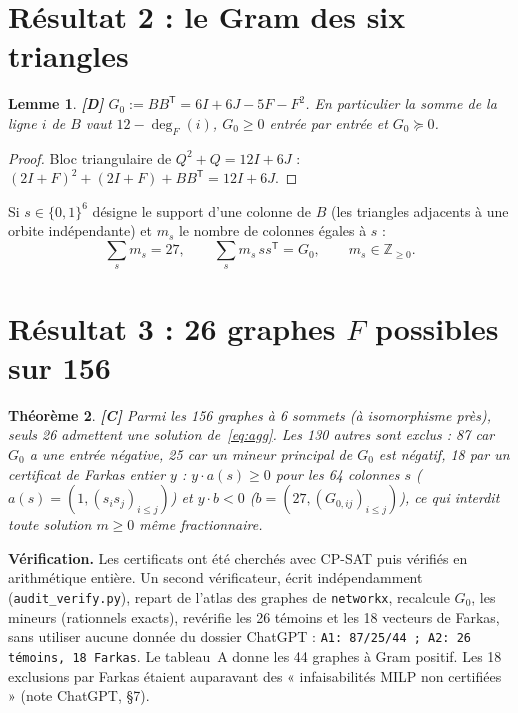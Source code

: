\documentclass[11pt,a4paper]{article}
\newtheorem{theorem}{Théorème}[section]
\newtheorem{lemma}[theorem]{Lemme}
\theoremstyle{remark}
\newcommand{\Z}{\mathbb{Z}}
\newcommand{\st}[1]{\textbf{[#1]}}
\newcommand{\code}[1]{\texttt{#1}}
\begin{document}
\section{Résultat 2 : le Gram des six triangles}\label{sec:gram}
\begin{lemma} \st{D}
$G_0:=BB^{\mathsf T}=6I+6J-5F-F^2$. En particulier la somme de la ligne $i$ de $B$ vaut $12-\deg_F(i)$, $G_0\ge0$ entrée par entrée et $G_0\succeq0$.
\end{lemma}
\begin{proof}
Bloc triangulaire de $Q^2+Q=12I+6J$ : $(2I+F)^2+(2I+F)+BB^{\mathsf T}=12I+6J$.
\end{proof}
Si $s\in\{0,1\}^6$ désigne le support d'une colonne de $B$ (les triangles adjacents à une orbite indépendante) et $m_s$ le nombre de colonnes égales à $s$ :
\begin{equation}\label{eq:agg}
\textstyle\sum_s m_s=27,\qquad \sum_s m_s\,ss^{\mathsf T}=G_0,\qquad m_s\in\Z_{\ge0}.
\end{equation}

\section{Résultat 3 : 26 graphes $F$ possibles sur 156}\label{sec:motifs}
\begin{theorem} \st{C}
Parmi les 156 graphes à 6 sommets (à isomorphisme près), seuls 26 admettent une solution de~\eqref{eq:agg}. Les 130 autres sont exclus :
87 car $G_0$ a une entrée négative, 25 car un mineur principal de $G_0$ est négatif, 18 par un \emph{certificat de Farkas entier}
$y$ : $y\cdot a(s)\ge0$ pour les 64 colonnes $s$ ($a(s)=(1,(s_is_j)_{i\le j})$) et $y\cdot b<0$ ($b=(27,(G_{0,ij})_{i\le j})$), ce qui interdit toute solution
$m\ge0$ \emph{même fractionnaire}.
\end{theorem}
\textbf{Vérification.} Les certificats ont été cherchés avec CP-SAT puis vérifiés en arithmétique entière. Un second vérificateur, écrit indépendamment
(\code{audit\_verify.py}), repart de l'atlas des graphes de \code{networkx}, recalcule $G_0$, les mineurs (rationnels exacts), revérifie les 26 témoins et les
18 vecteurs de Farkas, sans utiliser aucune donnée du dossier ChatGPT : \code{A1: 87/25/44 ; A2: 26 témoins, 18 Farkas}. Le tableau~A donne les 44 graphes à
Gram positif. Les 18 exclusions par Farkas étaient auparavant des « infaisabilités MILP non certifiées » (note ChatGPT, §7).
\end{document}
